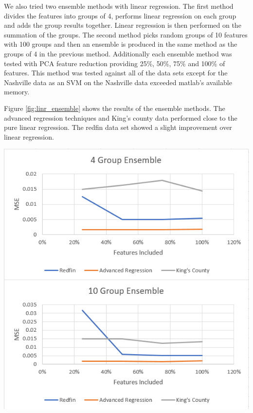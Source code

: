 \documentclass[10pt]{article}
\begin{document}
\begin{multicols}{2}
\begin{tabular}{r|c}
				\hline
			\end{tabular}
			\label{table:linr_performance}        
			\setlength{\parindent}{15pt}
		\par
		We also tried two ensemble methods with linear regression. The first method divides the features into groups of 4, performs linear regression on each group and adds the group results together. Linear regression is then performed on the summation of the groups. The second method picks random groups of 10 features with 100 groups and then an ensemble is produced in the same method as the groups of 4 in the previous method. Additionally each ensemble method was tested with PCA feature reduction providing 25\%, 50\%, 75\% and 100\% of features. This method was tested against all of the data sets except for the Nashville data as an SVM on the Nashville data exceeded matlab's available memory.
        \par
        Figure \ref{fig:linr_ensemble} shows the results of the ensemble methods. The advanced regression techniques and King's county data performed close to the pure linear regression. The redfin data set showed a slight improvement over linear regression.
		\begin{center}
                  \captionsetup{type=figure}
			\includegraphics[scale=0.6]{Images/LineEnsembleResults} \\
			\label{fig:linr_ensemble}
		\end{center}
		\par

\end{multicols}
\end{document}
